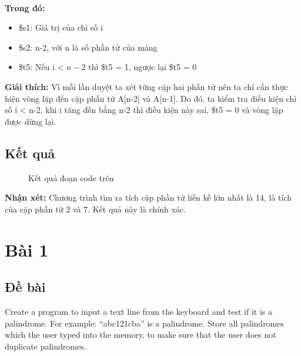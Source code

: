 \documentclass[a4paper,12pt]{article}
\begin{document}
\\
\noindent
\textbf{Trong đó: }
\begin{itemize}
    \item \$s1: Giá trị của chỉ số i
    \item \$s2: n-2, với n là số phần tử của mảng
    \item \$t5: Nếu i < $n-2$ thì \$t5 = 1, ngược lại \$t5 = 0
\end{itemize}
\noindent
\textbf{Giải thích: }Vì mỗi lần duyệt ta xét từng cặp hai phần tử nên ta chỉ cần thực hiện vòng lặp đến cặp phần tử A[n-2] và A[n-1]. Do đó, ta kiểm tra điều kiện chỉ số i < n-2, khi i tăng đến bằng n-2 thì điều kiện này sai, \$t5 = 0 và vòng lặp được dừng lại.
\clearpage
\subsection{Kết quả}
\begin{figure}[!h]
	\centerline{}
	\caption{Kết quả đoạn code trên}
	\label{fig:data6}
\end{figure}
\noindent
\textbf{Nhận xét: }Chương trình tìm ra tích cặp phần tử liền kề lớn nhất là 14, là tích của cặp phần tử 2 và 7. Kết quả này là chính xác.
\clearpage
\section{Bài 1}
\subsection{Đề bài}
Create a program to input a text line from the keyboard and test if it is a
palindrome. For example: “abc121cba” is a palindrome. Store all palindromes which
the user typed into the memory, to make sure that the user does not duplicate
palindromes.
\end{document}
